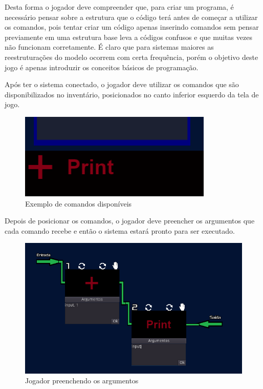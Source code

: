 Desta forma o jogador deve compreender que, para criar um programa, é necessário
pensar sobre a estrutura que o código terá antes de começar a utilizar os 
comandos, pois tentar criar um código apenas inserindo comandos sem pensar
previamente em uma estrutura base leva a códigos confusos e que muitas vezes
não funcionam corretamente. É claro que para sistemas maiores as reestruturações
do modelo ocorrem com certa frequência, porém o objetivo deste jogo é apenas
introduzir os conceitos básicos de programação.

Após ter o sistema conectado, o jogador deve utilizar os comandos que são
disponibilizados no inventário, posicionados no canto inferior esquerdo da tela 
de jogo.

\begin{figure}[H]
    \includegraphics[scale=0.8]{../figuras/exemplo_comandos.png}
    \caption{Exemplo de comandos disponíveis}
\end{figure}

Depois de posicionar os comandos, o jogador deve preencher os argumentos que 
cada comando recebe e então o sistema estará pronto para ser executado.

\begin{figure}[H]
    \includegraphics[width=\textwidth]{../figuras/preenchendo_argumentos.png}
    \caption{Jogador preenchendo os argumentos}
\end{figure}

